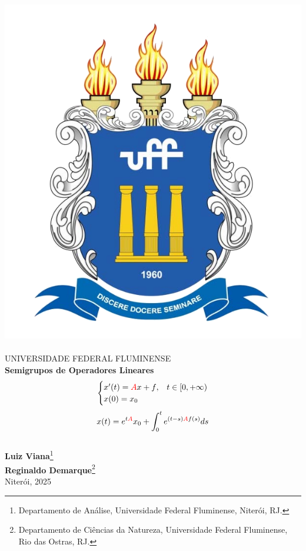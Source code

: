 \documentclass[12pt]{book}
\theoremstyle{definition}
\theoremstyle{remark}
\numberwithin{section}{chapter}
\numberwithin{equation}{chapter}
\begin{document}
\begin{titlepage}
\begin{center}
\includegraphics[scale=0.15]{brasao-cor.png}~\\
UNIVERSIDADE FEDERAL FLUMINENSE \\[4cm]
{\Huge \textbf{Semigrupos de Operadores Lineares}}\\
{\Large
\begin{equation*}
\begin{cases}
x'(t)={\color{red}A}x+{\color{black}f},& t\in [0,+\infty)\\
x(0)=x_0
\end{cases}
\end{equation*}
\begin{equation*}
x(t)=e^{t\color{red}A}x_0+\int_0^t e^{(t-s){\color{red}A}f(s)}ds
\end{equation*}}\\[1cm]
\textbf{Luiz Viana}\footnote{Departamento de Análise, Universidade Federal Fluminense, Niterói, RJ.}\\
\textbf{Reginaldo Demarque}\footnote{Departamento de Ciências da Natureza, Universidade Federal Fluminense, Rio das Ostras, RJ.}\\
\vfill
{\large Niterói, 2025}
\end{center}
\end{titlepage}
\end{document}
